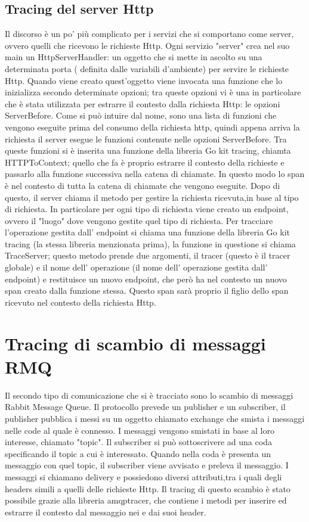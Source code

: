 \documentclass[a4paper,12pt,titlepage,italian,openany]{report}
\begin{document}
\subsection{Tracing del server Http}
Il discorso è un po' più complicato per i servizi che si comportano come server, ovvero quelli che ricevono le richieste Http. 
Ogni servizio "server" crea nel suo main un HttpServerHandler: un oggetto che si mette in ascolto su una determinata porta 
( definita dalle variabili d'ambiente) per servire le richieste Http. Quando viene creato quest'oggetto viene invocata una 
funzione che lo inizializza secondo determinate opzioni; tra queste opzioni 
vi è una in particolare che è stata utilizzata per estrarre il contesto dalla richiesta Http: le opzioni ServerBefore.
 Come si può intuire dal nome, sono una lista di funzioni che vengono eseguite prima del consumo della richiesta http, quindi appena
  arriva la richiesta il server esegue le funzioni contenute nelle opzioni ServerBefore. Tra queste funzioni
   si è inserita una funzione della libreria Go kit tracing, chiamta HTTPToContext; quello che fa è proprio estrarre il contesto
    della richieste e passarlo alla funzione successiva nella catena di chiamate. In questo modo  lo span è nel contesto di tutta
     la catena di chiamate che vengono eseguite.
Dopo di questo, il server chiama il metodo per gestire la richiesta ricevuta,in base al tipo di richiesta. In particolare per ogni tipo di richiesta viene creato un endpoint,
ovvero il "luogo" dove vengono gestite quel tipo di richiesta. Per tracciare l'operazione gestita dall'
endpoint si chiama una funzione della libreria Go kit tracing (la stessa libreria menzionata prima), la funzione in questione si chiama TraceServer; questo metodo prende due argomenti, il tracer (questo è il tracer globale) e il nome dell' operazione (il nome dell' operazione gestita dall' endpoint) e restituisce un nuovo endpoint, che però ha nel contesto un nuovo span creato dalla funzione stessa. Questo span sarà proprio il figlio dello span ricevuto nel contesto della richiesta Http. 

\section{Tracing di scambio di messaggi RMQ}
Il secondo tipo di comunicazione che si è tracciato sono lo scambio di messaggi Rabbit Message Queue. Il protocollo prevede un publisher e un subscriber, il publisher pubblica i messi su un oggetto chiamato exchange che smista i messaggi nelle code al quale è connesso. I messaggi vengono smistati in base al loro interesse, chiamato "topic". Il subscriber si può sottoscrivere ad una coda specificando il topic a cui è interessato. Quando nella coda è presenta un messaggio con quel topic, il subscriber viene avvisato e preleva il messaggio. I messaggi si chiamano delivery e possiedono diversi attributi,tra i quali degli headers simili a quelli delle richieste Http.
Il tracing di questo scambio è stato possibile grazie alla libreria amqptracer, che contiene i metodi per inserire ed estrarre il contesto dal messaggio nei e dai suoi header.
\end{document}
